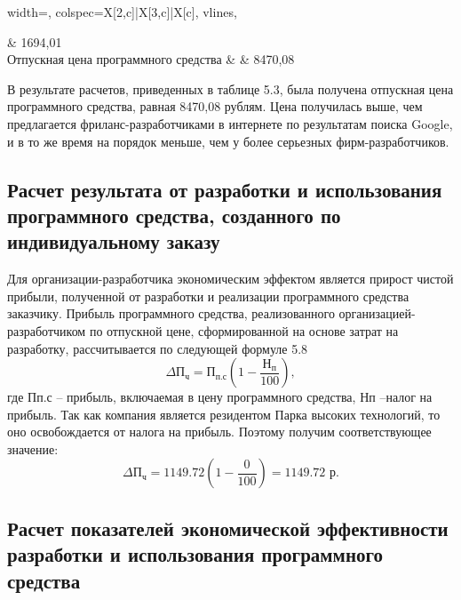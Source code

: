 \begin{table}[H]
\begin{tblr}{
			width=\textwidth,
			colspec={X[2,c]|X[3,c]|X[c]},  %
			vlines,
		}
		
		& 1694,01   \\
		\hline
		Отпускная цена программного
		средства & 
		& 8470,08  \\
		\hline
		
		
	\end{tblr}
	
\end{table}


В результате расчетов, приведенных в таблице 5.3, была получена отпускная цена программного средства, равная 8470,08 рублям. Цена получилась выше, чем предлагается фриланс-разработчиками в интернете по результатам поиска Google, и в то же время на порядок меньше, чем у более серьезных фирм-разработчиков. 


\subsection{Расчет результата от разработки и использования программного средства, созданного по индивидуальному заказу} 


Для организации-разработчика экономическим эффектом является прирост чистой прибыли, полученной от разработки и реализации программного средства заказчику.
Прибыль программного средства, реализованного организацией-разработчиком по отпускной цене, сформированной на основе затрат на разработку, рассчитывается по следующей формуле 5.8
\begin{equation}
	\Delta 	\mathrm{П_{ч}} = \mathrm{П_{п.с}} \left( 1 - \frac{	\mathrm{Н_{п}}}{100} \right),
\end{equation}
где Пп.с – прибыль, включаемая в цену программного средства, Нп –налог на прибыль. Так как компания является резидентом Парка высоких технологий, то оно освобождается от налога на прибыль. Поэтому получим соответствующее значение:
\[
\Delta \mathrm{П_{ч}} = 1149.72 \left(1 - \frac{0}{100}\right) = 1149.72 \text{ р}.
\]

\subsection{Расчет показателей экономической эффективности разработки и использования программного средства} 

